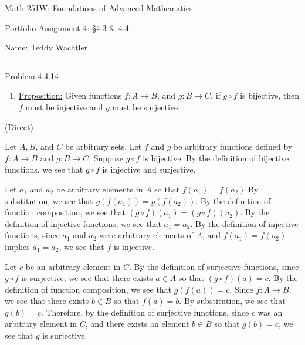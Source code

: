 \documentclass{article}
\theoremstyle{definition}
\begin{document}
	\begin{center}
		\Large{Math 251W: Foundations of Advanced Mathematics}
		\vspace{0.1cm}

		\normalsize Portfolio Assignment 4: \S 4.3 \& 4.4
		\vspace{0.1cm}

		\hfill Name: Teddy Wachtler
		\vspace{0.1cm}

		\hrule
		\vspace{0.5cm}
	\end{center}


	\noindent Problem 4.4.14
	\vspace{0.2cm}

	\begin{enumerate}
		\item[3]
		\underline{Proposition:}
		Given functions $f : A \rightarrow B$, and $g : B \rightarrow C$, if $g \circ f$ is bijective, then $f$ must be injective and $g$ must be surjective.

	\end{enumerate}

	\vspace{0.2cm}
	 (Direct)
	\vspace{0.2cm}

	Let $A, B$, and $C$ be arbitrary sets.
	Let $f$ and $g$ be arbitrary functions defined by $f : A \rightarrow B$ and $g : B \rightarrow C$.
	Suppose $g \circ f$ is bijective.
	By the definition of bijective functions, we see that $g \circ f$ is injective and surjective.

	Let $a_1$ and $a_2$ be arbitrary elements in $A$ so that $f(a_1) = f(a_2)$
	By substitution, we see that $g(f(a_1)) = g(f(a_2))$.
	By the definition of function composition, we see that $(g \circ f)(a_1) = (g \circ f)(a_2)$.
	By the definition of injective functions, we see that $a_1 = a_2$.
	By the definition of injective functions, since $a_1$ and $a_2$ were arbitrary elements of $A$, and $f(a_1) = f(a_2)$ implies $a_1 = a_2$, we see that $f$ is injective.

	Let $c$ be an arbitrary element in $C$.
	By the definition of surjective functions, since $g \circ f$ is surjective, we see that there exists $a \in A$ so that $(g \circ f)(a) = c$.
	By the definition of function composition, we see that $g(f(a)) = c$.
	Since $f : A \rightarrow B$, we see that there exists $b \in B$ so that $f(a) = b$.
	By substitution, we see that $g(b) = c$.
	Therefore, by the definition of surjective functions, since $c$ was an arbitrary element in $C$, and there exists an element $b \in B$ so that $g(b) = c$, we see that $g$ is surjective.
\end{document}
